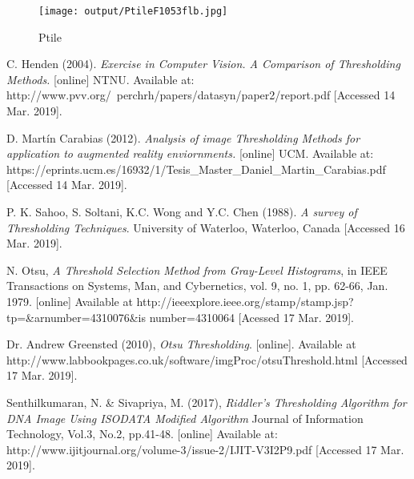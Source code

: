 \documentclass[12]{article}
\begin{document}
\begin{figure}[H]
\centering
  \texttt{[image: output/PtileF1053flb.jpg]}
  \caption{Ptile}
  \label{fig:Ptile}
    \vspace{-0.3cm}
\end{figure}
\newpage
\begin{thebibliography}{100}

C. Henden (2004). \textit{ Exercise in Computer Vision. A Comparison of Thresholding Methods.} [online] NTNU. Available at: http://www.pvv.org/~perchrh/papers/datasyn/paper2/report.pdf [Accessed 14 Mar. 2019].


D. Martín Carabias (2012). \textit{Analysis of image Thresholding Methods for application to augmented reality enviornments.} [online] UCM. Available at: https://eprints.ucm.es/16932/1/Tesis\_Master\_Daniel\_Martin\_Carabias.pdf [Accessed 14 Mar. 2019].


P. K. Sahoo, S. Soltani, K.C. Wong and Y.C. Chen (1988). \textit{A survey of Thresholding Techniques}. University of Waterloo, Waterloo, Canada  [Accessed 16 Mar. 2019].

\bibitem{}N. Otsu, \textit{A Threshold Selection Method from Gray-Level Histograms}, in IEEE Transactions on Systems, Man, and Cybernetics, vol. 9, no. 1, pp. 62-66, Jan. 1979.
[online] Available at http://ieeexplore.ieee.org/stamp/stamp.jsp?tp=\&arnumber=4310076\&is
number=4310064 [Acessed 17 Mar. 2019].

\bibitem{}Dr. Andrew Greensted (2010), \textit{Otsu Thresholding}. [online]. Available at http://www.labbookpages.co.uk/software/imgProc/otsuThreshold.html [Accessed 17 Mar. 2019].

\bibitem{}Senthilkumaran,  N.  \&  Sivapriya,  M.  (2017),  \textit{Riddler's  Thresholding Algorithm  for  DNA  Image  Using  ISODATA  Modified  Algorithm} Journal  of Information Technology, Vol.3, No.2, pp.41-48. [online] Available at: http://www.ijitjournal.org/volume-3/issue-2/IJIT-V3I2P9.pdf [Accessed 17 Mar. 2019].

\end{thebibliography}
\end{document}
